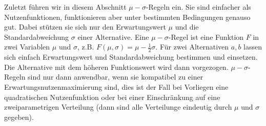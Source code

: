 Zuletzt führen wir in diesem Abschnitt \(\mu-\sigma\)-Regeln ein. Sie sind einfacher als Nutzenfunktionen, funktionieren aber unter bestimmten Bedingungen genauso gut. Dabei stützen sie sich nur den Erwartungswert \(\mu\) und die Standardabweichung \(\sigma\) einer Alternative. Eine \(\mu-\sigma\)-Regel ist eine Funktion \(F\) in zwei Variablen \(\mu\) und \(\sigma\), z.B. \(F(\mu, \sigma) = \mu - \frac{1}{2}\sigma\). Für zwei Alternativen \(a, b\) lassen sich einfach Erwartungswert und Standardabweichung bestimmen und einsetzen. Die Alternative mit dem höheren Funktionswert wird dann vorgezogen. \(\mu-\sigma\)-Regeln sind nur dann anwendbar, wenn sie kompatibel zu einer Erwartungsnutzenmaximierung sind, dies ist der Fall bei Vorliegen eine quadratischen Nutzenfunktion oder bei einer Einschränkung auf eine zweiparametrigen Verteilung (dann sind alle Verteilunge eindeutig durch \(\mu\) und \(\sigma\) gegeben).


